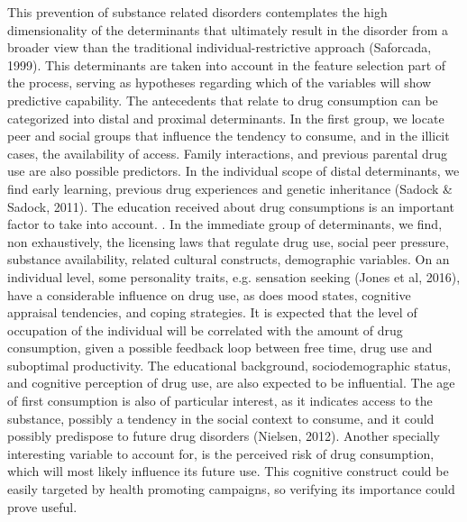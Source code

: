 \documentclass[8pt]{article}
\begin{document}
{\begin{multicols}{2}
This prevention of substance related disorders contemplates the high dimensionality of the determinants that ultimately result in the disorder from a broader view than the traditional individual-restrictive approach (Saforcada, 1999). This determinants are taken into account in the feature selection part of the process, serving as hypotheses regarding which of the variables will show predictive capability. The antecedents that relate to drug consumption can be categorized into distal and proximal determinants. In the first group, we locate peer and social groups that influence the tendency to consume, and in the illicit cases, the availability of access. Family interactions, and previous parental drug use are also possible predictors. In the individual scope of distal determinants, we find early learning, previous drug experiences and genetic inheritance (Sadock \& Sadock, 2011). The education received about drug consumptions is an important factor to take into account. . In the immediate group of determinants, we find, non exhaustively, the licensing laws that regulate drug use, social peer pressure, substance availability, related cultural constructs, demographic variables. On an individual level, some personality traits, e.g. sensation seeking (Jones et al, 2016), have a considerable influence on drug use, as does mood states, cognitive appraisal tendencies, and coping strategies. It is expected that the level of occupation of the individual will be correlated with the amount of drug consumption, given a possible feedback loop between free time, drug use and suboptimal productivity. The educational background, sociodemographic status, and cognitive perception of drug use, are also expected to be influential. The age of first consumption is also of particular interest, as it indicates access to the substance, possibly a tendency in the social context to consume, and it could possibly predispose to future drug disorders (Nielsen, 2012). Another specially interesting variable to account for, is the perceived risk of drug consumption, which will most likely influence its future use. This cognitive construct could be easily targeted by health promoting campaigns, so verifying its importance could prove useful.


\end{multicols}}
\end{document}
